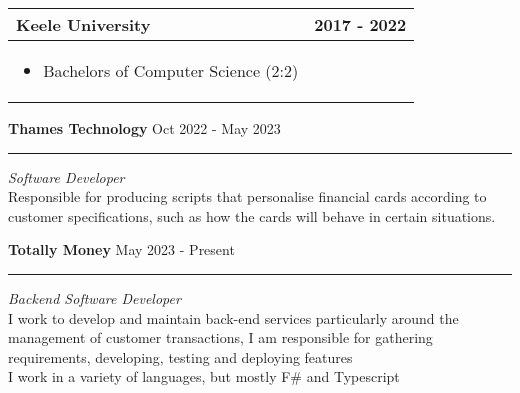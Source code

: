 \documentclass[11pt, twoside, a4paper]{article}
\newlength{\cvSideWidth}
\begin{document}
\begin{minipage}[t]{\textwidth - \cvSideWidth - 3cm}
\begin{center}
\begin{tabularx}{0.9\textwidth}{ >{\raggedright\arraybackslash}X c}
            \textbf{Keele University} & 2017 - 2022 \\
            \hline
            \begin{itemize}
                \item Bachelors of Computer Science (2:2)
            \end{itemize} \\
        \end{tabularx}
    \end{center}

    { \vspace{0.5cm} \LARGE {} }

    \textbf{Thames Technology} \hfill Oct 2022 - May 2023
    \hrule 
    \vspace{0.1cm}
    { \color{gray} \textit{Software Developer} } \\
    Responsible for producing scripts that personalise financial cards
    according to customer specifications, such as how the cards will behave in
    certain situations.

    \vspace{0.5cm}

    \textbf{Totally Money} \hfill May 2023 - Present
    \hrule 
    \vspace{0.1cm}
    { \color{gray} \textit{Backend Software Developer} } \\
    I work to develop and maintain back-end services particularly around the
    management of customer transactions, I am responsible for gathering
    requirements, developing, testing and deploying features \\
    I work in a variety of languages, but mostly F\# and Typescript

\end{minipage}
\end{document}
